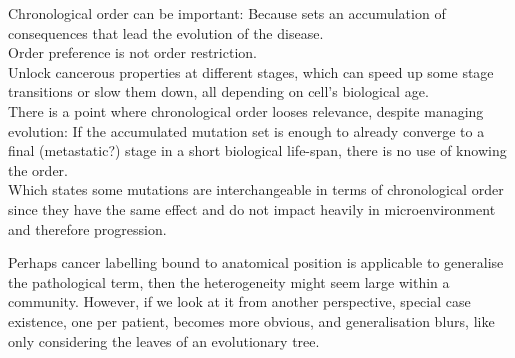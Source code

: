 Chronological order can be important:
Because sets an accumulation of consequences that lead the evolution of the disease.
\\

Order preference is not order restriction.
\\

Unlock cancerous properties at different stages, which can speed up some stage transitions or slow them down, all depending on cell’s biological age.
\\
There is a point where chronological order looses relevance, despite managing evolution: If the accumulated mutation set is enough to already converge to a final (metastatic?) stage in a short biological life-span, there is no use of knowing the order.
\\

Which states some mutations are interchangeable in terms of chronological order since they have the same effect and do not impact heavily in microenvironment and therefore progression.


Perhaps cancer labelling bound to anatomical position is applicable to generalise the pathological term, then the heterogeneity might seem large within a community. However, if we look at it from another perspective, special case existence, one per patient, becomes more obvious, and generalisation blurs, like only considering the leaves of an evolutionary tree.